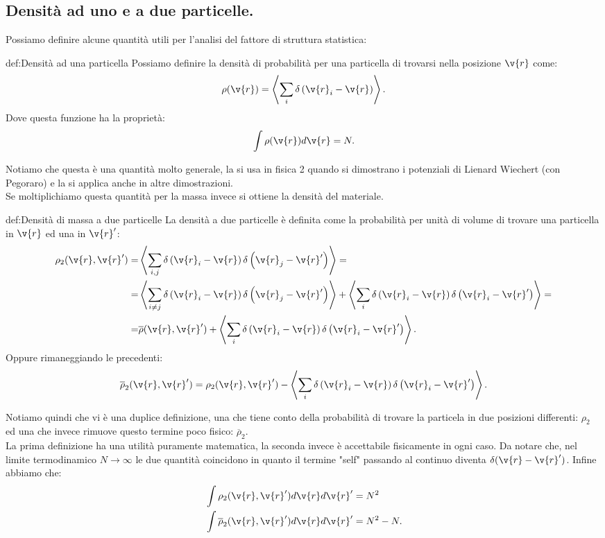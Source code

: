\subsection{Densità ad uno e a due particelle.}
\label{subsec:Densità ad uno e a due particelle.}
Possiamo definire alcune quantità utili per l'analisi del fattore di struttura statistica: 
\begin{defn}{def:Densità ad una particella}
	Possiamo definire la densità di probabilità per una particella di trovarsi nella posizione $\v{r}$ come:
	\[
		\rho (\v{r}) = \left<\sum_{i}^{} \delta\left( \v{r}_i - \v{r} \right)\right>
	.\] 
	Dove questa funzione ha la proprietà:
	\[
		\int\rho (\v{r})d \v{r} = N 
	.\] 
\end{defn}
Notiamo che questa è una quantità molto generale, la si usa in fisica 2 quando si dimostrano i potenziali di Lienard Wiechert (con Pegoraro) e la si applica anche in altre dimostrazioni. \\
Se moltiplichiamo questa quantità per la massa invece si ottiene la densità del materiale.
\newpage
\begin{defn}{def:Densità di massa a due particelle}
	La densità a due particelle è definita come la probabilità per unità di volume di trovare una particella in $\v{r}$ ed una in $\v{r}'$:
	\[\begin{aligned}
		\rho _2(\v{r},\v{r}') 
		=&
		\left<\sum_{i,j}^{} \delta\left( \v{r}_i-\v{r} \right) \delta\left( \v{r}_j-\v{r}' \right)  \right> =\\
		=&
		\left<\sum_{i\neq j}^{} \delta\left( \v{r}_i -\v{r} \right) \delta\left( \v{r}_j-\v{r}' \right)  \right>
		+
		\left<\sum_{i}^{} \delta\left( \v{r}_i-\v{r} \right) \delta\left( \v{r}_i -\v{r}' \right)  \right> = \\
		=&
		\overline{\rho}(\v{r},\v{r}') 
		+
		\left<\sum_{i}^{} \delta\left( \v{r}_i-\v{r} \right)\delta\left( \v{r}_i-\v{r}' \right)   \right>
	.\end{aligned}\]
	Oppure rimaneggiando le precedenti:
	\[
	    \overline{\rho }_2(\v{r},\v{r}') = \rho_2(\v{r},\v{r}') - 
		\left<\sum_{i}^{} \delta\left( \v{r}_i-\v{r} \right)\delta\left( \v{r}_i-\v{r}' \right)   \right>
	.\] 
\end{defn}
Notiamo quindi che vi è una duplice definizione, una che tiene conto della probabilità di trovare la particela in due posizioni differenti: $\rho _2$ ed una che invece rimuove questo termine poco fisico: $\overline{\rho }_2$.\\
La prima definizione ha una utilità puramente matematica, la seconda invece è accettabile fisicamente in ogni caso. Da notare che, nel limite termodinamico $N\to \infty$ le due quantità coincidono in quanto il termine "self" passando al continuo diventa $\delta (\v{r}-\v{r}')$. Infine abbiamo che:
\[\begin{aligned}
	&\int\rho _2(\v{r},\v{r}')d \v{r}d \v{r}' = N^2\\
	&\int \overline{\rho } _2(\v{r},\v{r}')d \v{r}d \v{r}' = N^2 -N
.\end{aligned}\]
